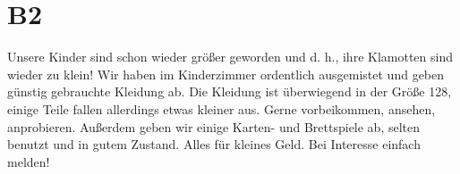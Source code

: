 \section{B2}
    Unsere Kinder sind schon wieder größer geworden und d. h., ihre Klamotten sind wieder zu klein!
    Wir haben im Kinderzimmer ordentlich ausgemistet und geben günstig gebrauchte Kleidung ab. Die Kleidung ist überwiegend in der Größe 128, einige Teile fallen allerdings etwas kleiner aus. Gerne vorbeikommen, ansehen, anprobieren. Außerdem geben wir einige Karten- und Brettspiele ab, selten benutzt und in gutem Zustand. Alles für kleines Geld. Bei Interesse einfach melden!